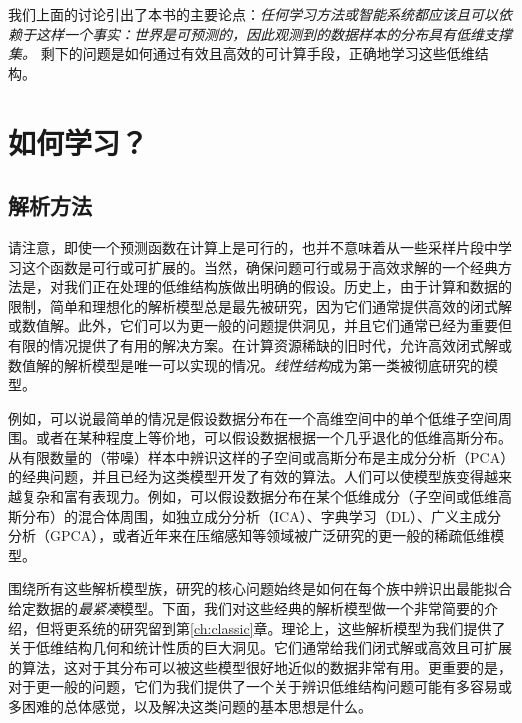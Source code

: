 \documentclass[../../book-main_zh.tex]{subfiles}
\begin{document}
我们上面的讨论引出了本书的主要论点：{\em 任何学习方法或智能系统都应该且可以依赖于这样一个事实：世界是可预测的，因此观测到的数据样本的分布具有低维支撑集。} 剩下的问题是如何通过有效且高效的可计算手段，正确地学习这些低维结构。

\section{如何学习？}


\subsection{解析方法}
\label{sec:analytical}
请注意，即使一个预测函数在计算上是可行的，也并不意味着从一些采样片段中学习这个函数是可行或可扩展的。当然，确保问题可行或易于高效求解的一个经典方法是，对我们正在处理的低维结构族做出明确的假设。历史上，由于计算和数据的限制，简单和理想化的解析模型总是最先被研究，因为它们通常提供高效的闭式解或数值解。此外，它们可以为更一般的问题提供洞见，并且它们通常已经为重要但有限的情况提供了有用的解决方案。在计算资源稀缺的旧时代，允许高效闭式解或数值解的解析模型是唯一可以实现的情况。{\em 线性结构}成为第一类被彻底研究的模型。

例如，可以说最简单的情况是假设数据分布在一个高维空间中的单个低维子空间周围。或者在某种程度上等价地，可以假设数据根据一个几乎退化的低维高斯分布。从有限数量的（带噪）样本中辨识这样的子空间或高斯分布是主成分分析（PCA）的经典问题，并且已经为这类模型开发了有效的算法\cite{JolliffeI2002}。人们可以使模型族变得越来越复杂和富有表现力。例如，可以假设数据分布在某个低维成分（子空间或低维高斯分布）的混合体周围，如独立成分分析（ICA）\cite{Ans-1985}、字典学习（DL）、广义主成分分析（GPCA）\cite{Vidal-GPCA}，或者近年来在压缩感知等领域被广泛研究的更一般的稀疏低维模型\cite{Wright-Ma-2022}。

围绕所有这些解析模型族，研究的核心问题始终是如何在每个族中辨识出最能拟合给定数据的{\em 最紧凑}模型。下面，我们对这些经典的解析模型做一个非常简要的介绍，但将更系统的研究留到第\ref{ch:classic}章。理论上，这些解析模型为我们提供了关于低维结构几何和统计性质的巨大洞见。它们通常给我们闭式解或高效且可扩展的算法，这对于其分布可以被这些模型很好地近似的数据非常有用。更重要的是，对于更一般的问题，它们为我们提供了一个关于辨识低维结构问题可能有多容易或多困难的总体感觉，以及解决这类问题的基本思想是什么。
\end{document}
